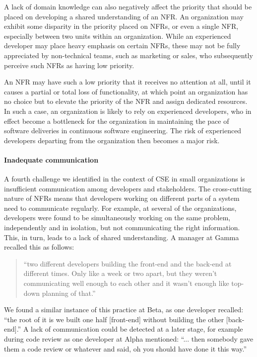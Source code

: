 \documentclass[smallextended]{svjour3}
\begin{document}
A lack of domain knowledge can also negatively affect the priority that should be placed on developing a shared understanding of an NFR.
An organization may exhibit some disparity in the priority placed on NFRs, or even a single NFR, especially between two units within an organization.
While an experienced developer may place heavy emphasis on certain NFRs, these may not be fully appreciated by non-technical teams, such as marketing or sales, who subsequently
perceive such NFRs as having low priority.

An NFR may have such a low priority that it receives no attention at all, until it causes a partial or total loss of functionality, at which point an organization has no choice but to elevate the priority of the NFR and assign dedicated resources. In such a case, an organization is likely to rely on experienced developers, who in effect become a bottleneck for the organization in maintaining the pace of software deliveries in continuous software engineering. The risk of experienced developers departing from the organization then becomes a major risk. 


\paragraph{Inadequate communication} A fourth challenge we identified in the context of CSE in small organizations is insufficient communication among developers and stakeholders. The cross-cutting nature of NFRs means that developers working on different parts of a system need to communicate regularly. 
For example, at several of the organizations, developers were found to be simultaneously working on the same problem, independently and in isolation, but not communicating the right information. This, in turn, leads to a lack of shared understanding. 
A manager at Gamma recalled this as follows:
\begin{quote}
    ``two different developers building the front-end and the back-end at different times. Only like a week or two apart, but they weren't communicating well enough to each other and it wasn't enough like top-down planning of that.''
\end{quote}    
We found a similar instance of this practice at Beta, as one developer recalled:
\textmd{``the root of it is we built one half [front-end] without building the other [back-end].''}
A lack of communication could be detected at a later stage, for example during code review as one developer at Alpha mentioned:
\textmd{``... then somebody gave them a code review or whatever and said, oh you should have done it this way.''}
\end{document}
